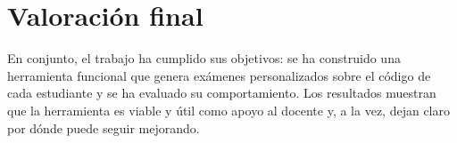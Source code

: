 \section{Valoración final}
\label{sec:valoracion-final}

En conjunto, el trabajo ha cumplido sus objetivos: se ha construido una
herramienta funcional que genera exámenes personalizados sobre el código de
cada estudiante y se ha evaluado su comportamiento. Los resultados muestran que
la herramienta es viable y útil como apoyo al docente y, a la vez, dejan claro
por dónde puede seguir mejorando.

